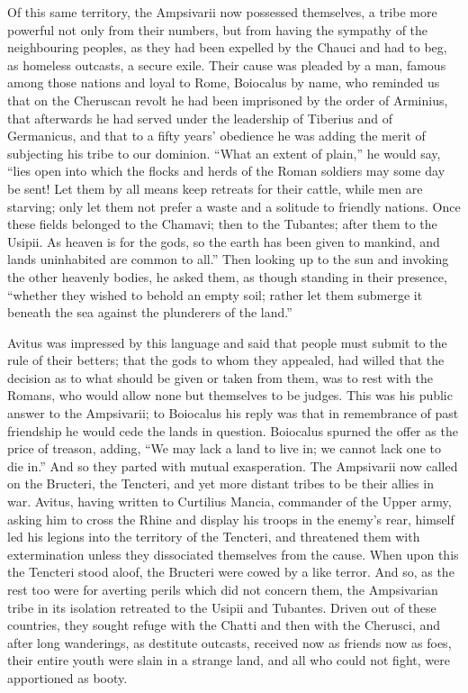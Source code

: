Of this same territory, the Ampsivarii now possessed themselves, a tribe more powerful not only from their numbers, but from having the sympathy of the neighbouring peoples, as they had been expelled by the Chauci and had to beg, as homeless outcasts, a secure exile. Their cause was pleaded by a man, famous among those nations and loyal to Rome, Boiocalus by name, who reminded us that on the Cheruscan revolt he had been imprisoned by the order of Arminius, that afterwards he had served under the leadership of Tiberius and of Germanicus, and that to a fifty years' obedience he was adding the merit of subjecting his tribe to our dominion. ``What an extent of plain,'' he would say, ``lies open into which the flocks and herds of the Roman soldiers may some day be sent! Let them by all means keep retreats for their cattle, while men are starving; only let them not prefer a waste and a solitude to friendly nations. Once these fields belonged to the Chamavi; then to the Tubantes; after them to the Usipii. As heaven is for the gods, so the earth has been given to mankind, and lands uninhabited are common to all.'' Then looking up to the sun and invoking the other heavenly bodies, he asked them, as though standing in their presence, ``whether they wished to behold an empty soil; rather let them submerge it beneath the sea against the plunderers of the land.''


Avitus was impressed by this language and said that people must submit to the rule of their betters; that the gods to whom they appealed, had willed that the decision as to what should be given or taken from them, was to rest with the Romans, who would allow none but themselves to be judges. This was his public answer to the Ampsivarii; to Boiocalus his reply was that in remembrance of past friendship he would cede the lands in question. Boiocalus spurned the offer as the price of treason, adding, ``We may lack a land to live in; we cannot lack one to die in.'' And so they parted with mutual exasperation. The Ampsivarii now called on the Bructeri, the Tencteri, and yet more distant tribes to be their allies in war. Avitus, having written to Curtilius Mancia, commander of the Upper army, asking him to cross the Rhine and display his troops in the enemy's rear, himself led his legions into the territory of the Tencteri, and threatened them with extermination unless they dissociated themselves from the cause. When upon this the Tencteri stood aloof, the Bructeri were cowed by a like terror. And so, as the rest too were for averting perils which did not concern them, the Ampsivarian tribe in its isolation retreated to the Usipii and Tubantes. Driven out of these countries, they sought refuge with the Chatti and then with the Cherusci, and after long wanderings, as destitute outcasts, received now as friends now as foes, their entire youth were slain in a strange land, and all who could not fight, were apportioned as booty.

